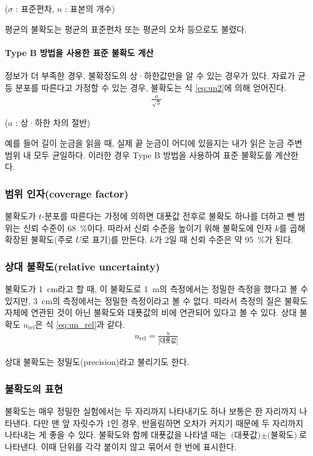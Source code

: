 \documentclass{GSHS-chemexp}
\begin{document}
	($\sigma$ : 표준편차, $n$ : 표본의 개수)
	
	평균의 불확도는 평균의 표준편차 또는 평균의 오차 등으로도 불렸다.
	\cite{Stephanie_Bell}
	
	\paragraph{Type B 방법을 사용한 표준 불확도 계산}
	정보가 더 부족한 경우, 불확정도의 상·하한값만을 알 수 있는 경우가 있다.
	자료가 균등 분포를 따른다고 가정할 수 있는 경우, 불확도는
	식 \ref{eq:un2}에 의해 얻어진다.
	\begin{gather}
	\frac{a}{\sqrt{3}} \label{eq:un2}
	\end{gather}
	
	($a$ : 상·하한 차의 절반)
	
	예를 들어 길이 눈금을 읽을 때, 실제 끝 눈금이 어디에 있을지는
	내가 읽은 눈금 주변 범위 내 모두 균일하다. 이러한 경우 Type B 방법을
	사용하여 표준 불확도를 계산한다.
	\cite{Stephanie_Bell}
	
	\subsubsection{범위 인자(coverage factor)}
	불확도가 $t$-분포를 따른다는 가정에 의하면 대푯값 전후로
	불확도 하나를 더하고 뺀 범위는 신뢰 수준이 \SI{68}{\percent}이다.
	따라서 신뢰 수준을 높이기 위해 불확도에 인자 $k$를 곱해
	확장된 불확도(주로 $U$로 표기)를 만든다. $k$가 2일 때
	신뢰 수준은 약 \SI{95}{\percent}가 된다.
	
	\subsubsection{상대 불확도(relative uncertainty)}
	불확도가 \SI{1}{\centi\metre}라고 할 때, 이 불확도로
	\SI{1}{\metre}의 측정에서는 정밀한 측정을 했다고 볼 수 있지만,
	\SI{3}{\centi\metre}의 측정에서는 정밀한 측정이라고 볼 수 없다.
	따라서 측정의 질은 불확도 자체에 연관된 것이 아닌 불확도와 대푯값의
	비에 연관되어 있다고 볼 수 있다. 상대 불확도 $u_{\mathrm{rel}}$은
	식 \ref{eq:un_rel}과 같다.
	\begin{gather}
	u_{\mathrm{rel}} = \frac{u}{|\text{대푯값}|} \label{eq:un_rel}
	\end{gather}
	
	상대 불확도는 정밀도(precision)라고 불리기도 한다.\cite{Taylor_John1}
	
	\subsubsection{불확도의 표현}
	불확도는 매우 정밀한 실험에서는 두 자리까지 나타내기도 하나
	보통은 한 자리까지 나타낸다. 다만 맨 앞 자릿수가 1인 경우,
	반올림하면 오차가 커지기 때문에 두 자리까지 나타내는 게 좋을 수 있다.
	불확도와 함께 대푯값을 나타낼 때는
	$\text{(대푯값)}\pm\text{(불확도)}$로 나타낸다.
	이때 단위를 각각 붙이지 않고 묶어서 한 번에 표시한다.
	
\end{document}
